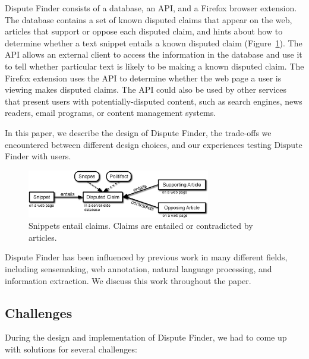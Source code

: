 \documentclass{www2010-submission}
\begin{document}
Dispute Finder consists of a database, an API, and a Firefox browser extension. The database contains a set of known disputed claims that appear on the web, articles that support or oppose each disputed claim, and hints about how to determine whether a text snippet entails a known disputed claim (Figure~\ref{snippet_claim_article}). The API allows an external client to access the information in the database and use it to tell whether particular text is likely to be making a known disputed claim. The Firefox extension uses the API to determine whether the web page a user is viewing makes disputed claims. The API could also be used by other services that present users with potentially-disputed content, such as search engines, news readers, email programs, or content management systems.

In this paper, we describe the design of Dispute Finder, the trade-offs we encountered between different design choices, and our experiences testing Dispute Finder with users.


\begin{figure}[tb]
	\begin{center}
	\includegraphics[width=8cm]{pictures/snippet_claim_article_fancy3.png}
	\caption{Snippets entail claims. Claims are entailed or contradicted by articles.}
	\label{snippet_claim_article}
	\end{center}
\end{figure}

Dispute Finder has been influenced by previous work in many different fields, including sensemaking, web annotation, natural language processing, and information extraction. We discuss this work throughout the paper.

\subsection{Challenges}

During the design and implementation of Dispute Finder, we had to come up with solutions for several challenges: 
\end{document}
